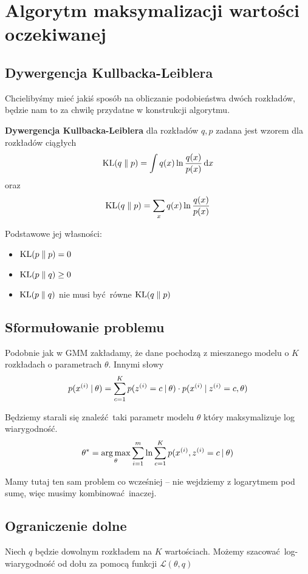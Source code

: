 \section{Algorytm maksymalizacji wartości oczekiwanej}

\subsection{Dywergencja Kullbacka-Leiblera}
Chcielibyśmy mieć jakiś sposób na obliczanie podobieństwa dwóch rozkładów, będzie nam to za chwilę przydatne w konstrukcji algorytmu.

\begin{definition}
	\textbf{Dywergencja Kullbacka-Leiblera} dla rozkładów \( q, p \) zadana jest wzorem dla rozkładów ciągłych
	\[
		\KL{q}{p} = \int q(x) \ln \frac{q(x)}{p(x)} \diff x
	\]
	oraz
	\[
		\KL{q}{p} = \sum_x q(x) \ln \frac{q(x)}{p(x)}
	\]
\end{definition}

Podstawowe jej własności:
\begin{itemize}
	\item \( \KL{p}{p} = 0 \)
	\item \( \KL{p}{q} \geq 0 \)
	\item \( \KL{p}{q} \) nie musi być równe \( \KL{q}{p} \)
\end{itemize}

\subsection{Sformułowanie problemu}

Podobnie jak w GMM zakładamy, że dane pochodzą z mieszanego modelu o \( K \) rozkładach o parametrach \( \theta \).
Innymi słowy
\[
	p(x^{(i)} \:\vert\: \theta) = \sum_{c=1}^K p(z^{(i)} = c \:\vert\: \theta) \cdot p(x^{(i)} \:\vert\: z^{(i)} = c, \theta)
\]

Będziemy starali się znaleźć taki parametr modelu \( \theta \) który maksymalizuje log wiarygodność.
\[
	\theta^* = \operatorname*{arg\,max}_\theta \sum_{i=1}^m \ln \sum_{c=1}^K p(x^{(i)}, z^{(i)} = c \:\vert\: \theta)
\]

Mamy tutaj ten sam problem co wcześniej -- nie wejdziemy z logarytmem pod sumę, więc musimy kombinować inaczej.

\subsection{Ograniczenie dolne}

Niech \( q \) będzie dowolnym rozkładem na \( K \) wartościach. Możemy szacować log-wiarygodność od dołu za pomocą funkcji \( \mathcal{L}(\theta, q) \)

